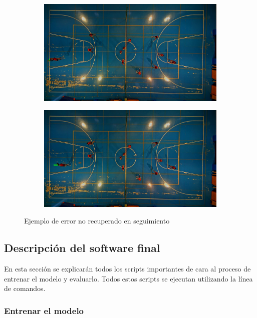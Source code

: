 \begin{figure}
  \begin{subfigure}{.5\textwidth}
    \centering
    \includegraphics[width=.9\linewidth]{images/out1_1}
  \end{subfigure}%
  \begin{subfigure}{.5\textwidth}
    \centering
    \includegraphics[width=.9\linewidth]{images/out1_2}
  \end{subfigure}
  \caption{Ejemplo de error no recuperado en seguimiento}
  \label{fig:out1}
  \end{figure}


\subsection{Descripción del software final}

En esta sección se explicarán todos los scripts importantes de cara al proceso de entrenar el modelo y evaluarlo. Todos estos scripts se ejecutan utilizando la línea de comandos.

\subsubsection*{Entrenar el modelo}

